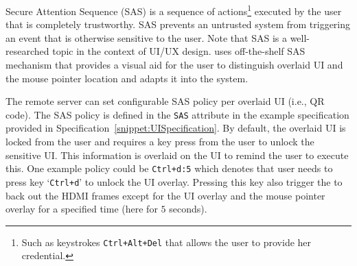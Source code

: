 Secure Attention Sequence (SAS) is a sequence of actions\footnote{Such as keystrokes \texttt{Ctrl+Alt+Del} that allows the user to provide her credential.} executed by the user that is completely trustworthy. SAS prevents an untrusted system from triggering an event that is otherwise sensitive to the user. Note that SAS is a well-researched topic in the context of UI/UX design. \name uses off-the-shelf SAS mechanism that provides a visual aid for the user to distinguish overlaid UI and the mouse pointer location and adapts it into the system. 

 The remote server can set configurable SAS policy per overlaid UI (i.e., QR code). The SAS policy is defined in the \texttt{SAS} attribute in the example specification provided in Specification~\ref{snippet:UISpecification}. By default, the overlaid UI is locked from the user and requires a key press from the user to unlock the sensitive UI. This information is overlaid on the UI to remind the user to execute this. One example policy could be \texttt{Ctrl+d:5} which denotes that user needs to press key `\texttt{Ctrl+d}' to unlock the UI overlay. Pressing this key also trigger the \device to back out the HDMI frames except for the UI overlay and the mouse pointer overlay for a specified time (here for $5$ seconds). 




